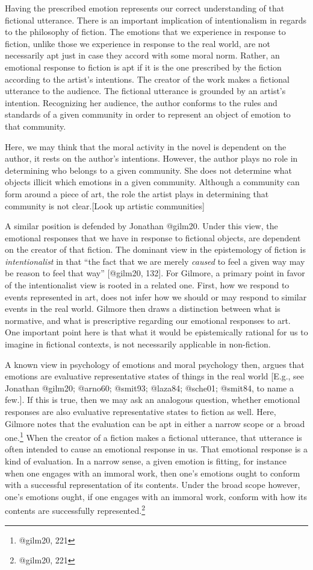 \documentclass[
  letterpaper,
  DIV=11,
  numbers=noendperiod]{scrartcl}
\theoremstyle{remark}
\begin{document}
Having the prescribed emotion represents our correct understanding of
that fictional utterance. There is an important implication of
intentionalism in regards to the philosophy of fiction. The emotions
that we experience in response to fiction, unlike those we experience in
response to the real world, are not necessarily apt just in case they
accord with some moral norm. Rather, an emotional response to fiction is
apt if it is the one prescribed by the fiction according to the artist's
intentions. The creator of the work makes a fictional utterance to the
audience. The fictional utterance is grounded by an artist's intention.
Recognizing her audience, the author conforms to the rules and standards
of a given community in order to represent an object of emotion to that
community.

Here, we may think that the moral activity in the novel is dependent on
the author, it rests on the author's intentions. However, the author
plays no role in determining who belongs to a given community. She does
not determine what objects illicit which emotions in a given community.
Although a community can form around a piece of art, the role the artist
plays in determining that community is not clear.{[}Look up artistic
communities{]}

A similar position is defended by Jonathan @gilm20. Under this view, the
emotional responses that we have in response to fictional objects, are
dependent on the creator of that fiction. The dominant view in the
epistemology of fiction is \emph{intentionalist} in that ``the fact that
we are merely \emph{caused} to feel a given way may be reason to feel
that way'' {[}@gilm20, 132{]}. For Gilmore, a primary point in favor of
the intentionalist view is rooted in a related one. First, how we
respond to events represented in art, does not infer how we should or
may respond to similar events in the real world. Gilmore then draws a
distinction between what is normative, and what is prescriptive
regarding our emotional responses to art. One important point here is
that what it would be epistemically rational for us to imagine in
fictional contexts, is not necessarily applicable in non-fiction.

A known view in psychology of emotions and moral psychology then, argues
that emotions are evaluative representative states of things in the real
world {[}E.g., see Jonathan @gilm20; @arno60; @smit93; @laza84; @sche01;
@smit84, to name a few.{]}. If this is true, then we may ask an
analogous question, whether emotional responses are also evaluative
representative states to fiction as well. Here, Gilmore notes that the
evaluation can be apt in either a narrow scope or a broad
one.\footnote{@gilm20, 221} When the creator of a fiction makes a
fictional utterance, that utterance is often intended to cause an
emotional response in us. That emotional response is a kind of
evaluation. In a narrow sense, a given emotion is fitting, for instance
when one engages with an immoral work, then one's emotions ought to
conform with a successful representation of its contents. Under the
broad scope however, one's emotions ought, if one engages with an
immoral work, conform with how its contents are successfully
represented.\footnote{@gilm20, 221}
\end{document}

